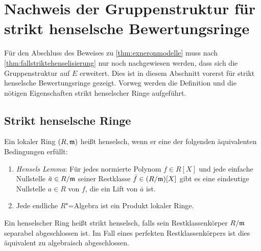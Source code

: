 \section[Gruppenstruktur für strikt henselsche Ringe]%
{Nachweis der Gruppenstruktur für strikt henselsche Bewertungsringe}
\label{chap:gruppestrikthenselsch}
Für den Abschluss des Beweises zu \ref{thm:exneronmodelle} muss
nach \ref{thm:fallstriktehenselisierung} nur noch nachgewiesen werden,
dass sich die Gruppenstruktur auf $E$ erweitert.
Dies ist in diesem Abschnitt vorerst für strikt henselsche
Bewertungsringe gezeigt. Vorweg werden die Definition und die nötigen
Eigenschaften strikt henselscher Ringe aufgeführt.
\subsection{Strikt henselsche Ringe}
\begin{Definition}\label{def:henselscheringe}
  Ein lokaler Ring $(R,\mathfrak{m})$ heißt henselsch, wenn
  er eine der folgenden äquivalenten Bedingungen erfüllt:
  \begin{enumerate}[label=(\roman*)]
  \item \emph{Hensels Lemma}:
    Für jedes normierte Polynom $f\in R[X]$ und jede einfache Nullstelle
    $\bar a\in R/\mathfrak{m}$ seiner Restklasse $\bar f\in (R/\mathfrak{m})[X]$
    gibt es eine eindeutige Nullstelle ${a\in R}$ von $f$, die ein Lift
    von $\bar a$ ist.
  \item Jede endliche $R$"=Algebra ist ein Produkt lokaler Ringe.
  \end{enumerate}
  Ein henselscher Ring heißt strikt henselsch, falls sein
  Restklassenkörper $R/\mathfrak{m}$ separabel abgeschlossen ist.
  Im Fall eines perfekten Restklassenkörpers ist dies äquivalent zu
  algebraisch abgeschlossen.
\end{Definition}

  

